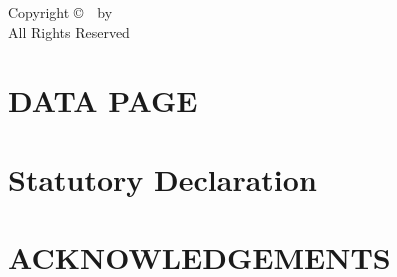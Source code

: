 \thispagestyle{empty}%
\vspace*{\fill}
\begin{center}
Copyright \copyright ~\mypubyear~by \myname\\
All Rights Reserved
\end{center}
\vspace*{\fill}
\clearpage


\mySpacing
{} \setcounter{page}{3}



\chapter*{DATA PAGE}
\label{ch:Acknowledgements}
\vspace{7mm}



\chapter*{Statutory Declaration}
\label{ch:Statutory Declaration}
\vspace{7mm}



\chapter*{}
\vspace{7mm}
\vspace*{\fill}
\begin{center}

\end{center}
\vspace*{\fill}


\chapter*{ACKNOWLEDGEMENTS}
\label{ch:Acknowledgements}
\vspace{7mm}



